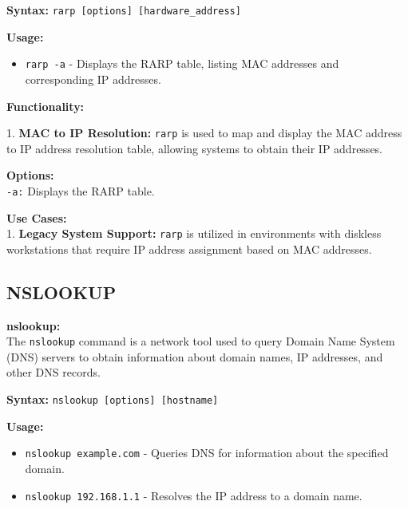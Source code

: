 \documentclass[11pt]{report}
\begin{document}
\vspace{\baselineskip}

\textbf{Syntax:}
\texttt{rarp [options] [hardware\_address]}

\vspace{\baselineskip}

\textbf{Usage:}
\begin{itemize}
    \item \texttt{rarp -a} - Displays the RARP table, listing MAC addresses and corresponding IP addresses.
\end{itemize}

\vspace{\baselineskip}

\textbf{Functionality:}

1. \textbf{MAC to IP Resolution:} \texttt{rarp} is used to map and display the MAC address to IP address resolution table, allowing systems to obtain their IP addresses.

\vspace{\baselineskip}

\textbf{Options:} \\
\texttt{-a:} Displays the RARP table.

\vspace{\baselineskip}

\textbf{Use Cases:} \\
1. \textbf{Legacy System Support:} \texttt{rarp} is utilized in environments with diskless workstations that require IP address assignment based on MAC addresses.

\vspace{\baselineskip}

\subsection{NSLOOKUP}
\textbf{nslookup:} \\
The \texttt{nslookup} command is a network tool used to query Domain Name System (DNS) servers to obtain information about domain names, IP addresses, and other DNS records.

\vspace{\baselineskip}

\textbf{Syntax:}
\texttt{nslookup [options] [hostname]}

\vspace{\baselineskip}

\textbf{Usage:}
\begin{itemize}
    \item \texttt{nslookup example.com} - Queries DNS for information about the specified domain.
    \item \texttt{nslookup 192.168.1.1} - Resolves the IP address to a domain name.
\end{itemize}
\end{document}
